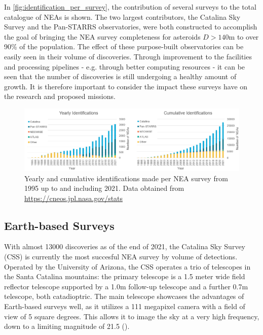 In \autoref{fig:identification_per_survey}, the contribution of several surveys to the total catalogue of NEAs is shown. The two largest contributors, the Catalina Sky Survey and the Pan-STARRS observatories, were both constructed to accomplish the goal of bringing the NEA survey completeness for asteroids $D > 140 \mathrm{m}$ to over 90\% of the population. The effect of these purpose-built observatories can be easily seen in their volume of discoveries. Through improvement to the facilities and processing pipelines - e.g. through better computing resources - it can be seen that the number of discoveries is still undergoing a healthy amount of growth. It is therefore important to consider the impact these surveys have on the research and proposed missions.

\begin{figure}[htbp]
 \centering
 \includegraphics[width=1.0\textwidth]{img/identification_per_survey.png}
 \caption{Yearly and cumulative identifications made per NEA survey from 1995 up to and including 2021. Data obtained from \url{https://cneos.jpl.nasa.gov/stats}}
 \label{fig:identification_per_survey}
\end{figure}


\subsection{Earth-based Surveys}
With almost 13000 discoveries as of the end of 2021, the Catalina Sky Survey (CSS) is currently the most succesful NEA survey by volume of detections. Operated by the University of Arizona, the CSS operates a trio of telescopes in the Santa Catalina mountains: the primary telescope is a 1.5 meter wide field reflector telescope supported by a 1.0m follow-up telescope and a further 0.7m telescope, both catadioptric. The main telescope showcases the advantages of Earth-based surveys well, as it utilizes a 111 megapixel camera with a field of view of 5 square degrees. This allows it to image the sky at a very high frequency, down to a limiting magnitude of 21.5 (\cite{CatalinaSkySurvey}).\\

